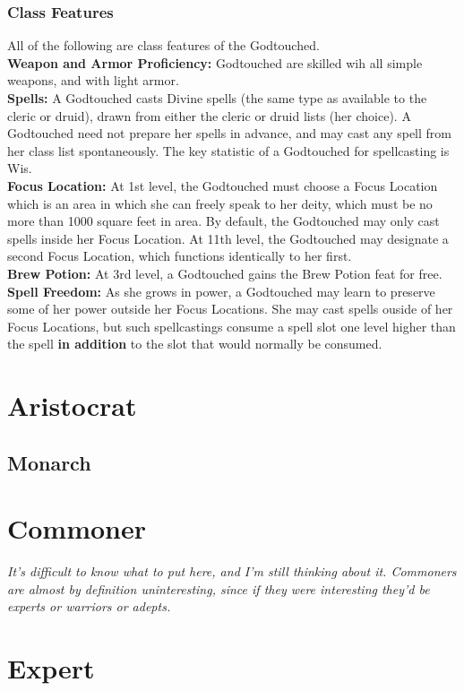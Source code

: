 \documentclass[11pt]{report}
\begin{document}
\subsubsection{Class Features}
All of the following are class features of the Godtouched. \\
\textbf{Weapon and Armor Proficiency:} Godtouched are skilled wih all simple
weapons, and with light armor. \\
\textbf{Spells:} A Godtouched casts Divine spells (the same type as available to
the cleric or druid), drawn from either the cleric or druid lists (her choice).
A Godtouched need not prepare her spells in advance, and may cast any spell from
her class list spontaneously. The key statistic of a Godtouched for spellcasting
is Wis. \\
\textbf{Focus Location:} At 1st level, the Godtouched must choose a Focus
Location which is an area in which she can freely speak to her deity, which must
be no more than 1000 square feet in area. By default, the Godtouched may only
cast spells inside her Focus Location. At 11th level, the Godtouched may
designate a second Focus Location, which functions identically to her first. \\
\textbf{Brew Potion:} At 3rd level, a Godtouched gains the Brew Potion feat for
free. \\
\textbf{Spell Freedom:} As she grows in power, a Godtouched may learn to
preserve some of her power outside her Focus Locations. She may cast spells
ouside of her Focus Locations, but such spellcastings consume a spell slot one
level higher than the spell \textbf{in addition} to the slot that would normally
be consumed. 

\section{Aristocrat}
\subsection{Monarch}

\section{Commoner}
\textit{It's difficult to know what to put here, and I'm still thinking about
it. Commoners are almost by definition uninteresting, since if they were
interesting they'd be experts or warriors or adepts.}

\section{Expert}
\end{document}
